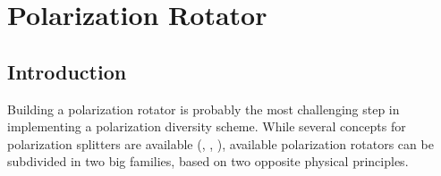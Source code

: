\chapter{Polarization Rotator} \label{cha:polrot} 

\section{Introduction}

Building a polarization rotator is
probably the most challenging step in implementing a polarization
diversity scheme. While several concepts
for polarization splitters are available (\cite{kiyat_compact},
\cite{taillaert_compact}, \cite{wu_planar}), available polarization
rotators can be subdivided in two big families, based on two opposite
physical principles.
